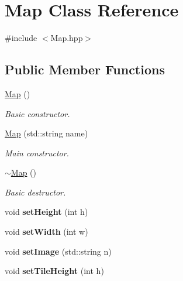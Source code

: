 \hypertarget{class_map}{\section{Map Class Reference}
\label{class_map}
}


{\ttfamily \#include $<$Map.\-hpp$>$}

\subsection*{Public Member Functions}
\begin{DoxyCompactItemize}
\item 
\hyperlink{class_map_a0f5ad0fd4563497b4214038cbca8b582}{Map} ()
\begin{DoxyCompactList}\small\item\em Basic constructor. \end{DoxyCompactList}\item 
\hyperlink{class_map_aeec3ac95150a6a9df4a417be707bcf9d}{Map} (std\-::string name)
\begin{DoxyCompactList}\small\item\em Main constructor. \end{DoxyCompactList}\item 
\hypertarget{class_map_aa403fbe09394ccf39747588f5168e3b2}{\hyperlink{class_map_aa403fbe09394ccf39747588f5168e3b2}{$\sim$\-Map} ()}\label{class_map_aa403fbe09394ccf39747588f5168e3b2}

\begin{DoxyCompactList}\small\item\em Basic destructor. \end{DoxyCompactList}\item 
\hypertarget{class_map_affab3537641a7985559f83ea083e00ca}{void {\bfseries set\-Height} (int h)}\label{class_map_affab3537641a7985559f83ea083e00ca}

\item 
\hypertarget{class_map_a2915ccde4d8a2ba8142677baea803467}{void {\bfseries set\-Width} (int w)}\label{class_map_a2915ccde4d8a2ba8142677baea803467}

\item 
\hypertarget{class_map_a7ac17b33fc7266fcc30b19c33c70c3ca}{void {\bfseries set\-Image} (std\-::string n)}\label{class_map_a7ac17b33fc7266fcc30b19c33c70c3ca}

\item 
\hypertarget{class_map_a7faf61ea4f43b4c1e15bd3d8744366b6}{void {\bfseries set\-Tile\-Height} (int h)}\label{class_map_a7faf61ea4f43b4c1e15bd3d8744366b6}


\end{DoxyCompactItemize}

